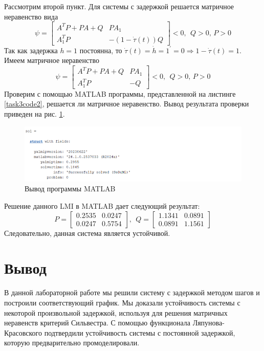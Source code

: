 \documentclass[a4paper, 12pt]{article}
\begin{document}
    Рассмотрим второй пункт. Для системы с задержкой решается матричное неравенство вида
    $$
    \psi=
    \begin{bmatrix}
        A^TP+PA+Q & PA_1\\
        A^T_1P & -(1-\dot{\tau}(t))Q
    \end{bmatrix}<0,\ \ Q>0,\, P>0
    $$
    Так как задержка $h=1$ постоянна, то $\dot{\tau}(t)=\dot{h}=1^{\prime}=0\Rightarrow1-\dot{\tau}(t)=1$.
    Имеем матричное неравенство
    $$
    \psi=
    \begin{bmatrix}
        A^TP+PA+Q & PA_1\\
        A^T_1P & -Q
    \end{bmatrix}<0,\ \ Q>0,\, P>0
    $$
    Проверим с помощью MATLAB программы, представленной на листинге \ref{task3code2}, решается
    ли матричное неравенство. Вывод результата проверки приведен на рис. \ref{fig:result3}.
    \begin{figure}[H]
        \centering
        \includegraphics[scale=0.7]{result3.png}
        \captionsetup{skip=0pt}
        \caption{Вывод программы MATLAB}
        \label{fig:result3}
    \end{figure}
    \noindent Решение данного LMI в MATLAB дает следующий результат:
    $$
    P=
    \begin{bmatrix}
        0.2535 & 0.0247\\
        0.0247 & 0.5754
    \end{bmatrix},\ \
    Q=
    \begin{bmatrix}
        1.1341 & 0.0891\\
        0.0891 & 1.1561
    \end{bmatrix}
    $$
    Следовательно, данная система является устойчивой.


    \section{Вывод}
    В данной лабораторной работе мы решили систему с задержкой методом шагов и построили соответствующий график.
    Мы доказали устойчивость системы с некоторой произвольной задержкой, используя для решения матричных
    неравенств критерий Сильвестра. С помощью функционала Ляпунова-Красовского подтвердили устойчивость
    системы с постоянной задержкой, которую предварительно промоделировали.
\end{document}
